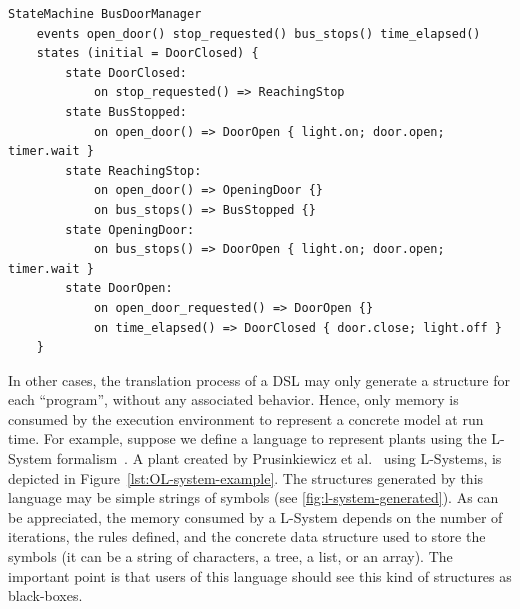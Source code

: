 \begin{lstlisting}[caption={State machine to control the door of a bus.},label={lst:state-machine},style=statemachinelang,frame=single]
StateMachine BusDoorManager
	events open_door() stop_requested() bus_stops() time_elapsed() 
	states (initial = DoorClosed) {
		state DoorClosed:
			on stop_requested() => ReachingStop
		state BusStopped:
			on open_door() => DoorOpen { light.on; door.open; timer.wait }
		state ReachingStop:
			on open_door() => OpeningDoor {}
			on bus_stops() => BusStopped {}
		state OpeningDoor:
			on bus_stops() => DoorOpen { light.on; door.open; timer.wait }
		state DoorOpen:
			on open_door_requested() => DoorOpen {}
			on time_elapsed() => DoorClosed { door.close; light.off }
	}
\end{lstlisting}

In other cases, the translation process of a DSL may only generate a structure for each ``program'', without any associated behavior.
Hence, only memory is consumed by the execution environment to represent a concrete model at run time.
For example, suppose we define a language to represent plants using the L-System formalism~\cite{Prusinkiewicz1990}.
A plant created by Prusinkiewicz et al.~\cite{Prusinkiewicz1990} using L-Systems, is depicted in Figure~\ref{lst:OL-system-example}.
The structures generated by this language may be simple strings of symbols (see \ref{fig:l-system-generated}).
As can be appreciated, the memory consumed by a L-System depends on the number of iterations, the rules defined, and the concrete data structure used to store the symbols
(it can be a string of characters, a tree, a list, or an array).
The important point is that users of this language should see this kind of structures as black-boxes.



